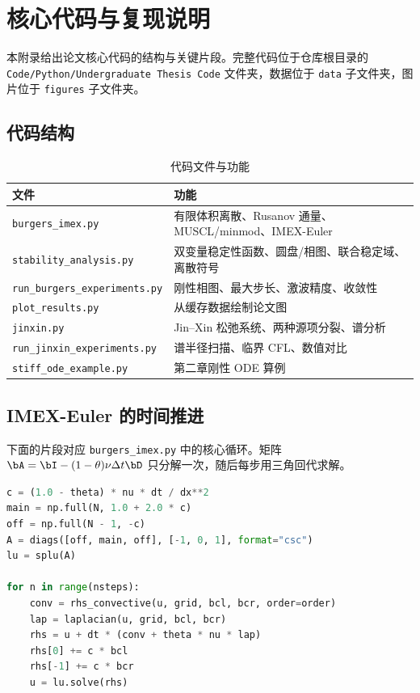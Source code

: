 \chapter{核心代码与复现说明}

本附录给出论文核心代码的结构与关键片段。完整代码位于仓库根目录的 \texttt{Code/Python/Undergraduate Thesis Code} 文件夹，数据位于 \texttt{data} 子文件夹，图片位于 \texttt{figures} 子文件夹。

\section{代码结构}

\begin{table}[htbp]
  \centering
  \small
  \caption{代码文件与功能}
  \label{tab:code-files}
  \begin{tabularx}{\textwidth}{lX}
    \toprule
    文件 & 功能 \\
    \midrule
    \texttt{burgers\_imex.py} & 有限体积离散、Rusanov 通量、MUSCL/minmod、IMEX-Euler \\
    \texttt{stability\_analysis.py} & 双变量稳定性函数、圆盘/相图、联合稳定域、离散符号 \\
    \texttt{run\_burgers\_experiments.py} & 刚性相图、最大步长、激波精度、收敛性 \\
    \texttt{plot\_results.py} & 从缓存数据绘制论文图 \\
    \texttt{jinxin.py} & Jin--Xin 松弛系统、两种源项分裂、谱分析 \\
    \texttt{run\_jinxin\_experiments.py} & 谱半径扫描、临界 CFL、数值对比 \\
    \texttt{stiff\_ode\_example.py} & 第二章刚性 ODE 算例 \\
    \bottomrule
  \end{tabularx}
\end{table}

\clearpage
\section{IMEX-Euler 的时间推进}

下面的片段对应 \texttt{burgers\_imex.py} 中的核心循环。矩阵 $\bA=\bI-(1-\theta)\nu\Delta t\bD$ 只分解一次，随后每步用三角回代求解。

\begin{lstlisting}[language=Python,caption={IMEX-Euler 时间推进的核心循环}]
c = (1.0 - theta) * nu * dt / dx**2
main = np.full(N, 1.0 + 2.0 * c)
off = np.full(N - 1, -c)
A = diags([off, main, off], [-1, 0, 1], format="csc")
lu = splu(A)

for n in range(nsteps):
    conv = rhs_convective(u, grid, bcl, bcr, order=order)
    lap = laplacian(u, grid, bcl, bcr)
    rhs = u + dt * (conv + theta * nu * lap)
    rhs[0] += c * bcl
    rhs[-1] += c * bcr
    u = lu.solve(rhs)
\end{lstlisting}

